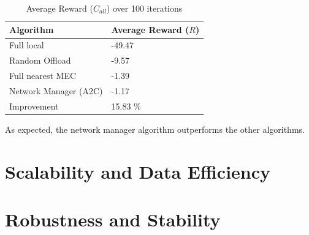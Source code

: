 \begin{table}[H]
\centering
\begin{tabular}{|l|l|}
\hline
Algorithm        & Average Reward ($R$) \\ \hline
Full local       & -49.47\\
Random Offload   & -9.57\\
Full nearest MEC & -1.39\\ 
Network Manager (A2C) & -1.17\\ \hline
Improvement & 15.83 \%\\ \hline
\end{tabular}
\caption{Average Reward ($C_{all}$) over 100 iterations} \label{resultstest1}
\end{table}

As expected, the network manager algorithm outperforms the other algorithms.
\section{Scalability and Data Efficiency}

\section{Robustness and Stability}